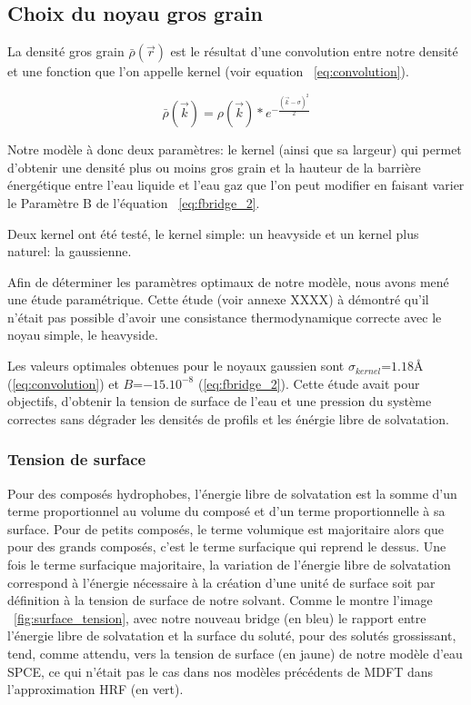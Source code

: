 \subsection{Choix du noyau gros grain}
La densité gros grain $\bar{\rho}(\vec{r})$ est le résultat d'une convolution entre notre densité et une fonction que l'on appelle kernel (voir equation ~\ref{eq:convolution}).

\begin{equation} \label{eq:convolution}
\bar{\rho}(\vec{k})=\rho(\vec{k})*e^{-\frac{(\vec{k}-\sigma)^{2}}{2}}
\end{equation}

Notre modèle à donc deux paramètres: le kernel (ainsi que sa largeur) qui permet d'obtenir une densité plus ou moins gros grain et la hauteur de la barrière énergétique entre l'eau liquide et l'eau gaz que l'on peut modifier en faisant varier le Paramètre B de l'équation ~\ref{eq:fbridge_2}.

Deux kernel ont été testé, le kernel simple: un heavyside et un kernel plus naturel: la gaussienne.

Afin de déterminer les paramètres optimaux de notre modèle, nous avons mené une étude paramétrique. Cette étude (voir annexe XXXX) à démontré qu'il n'était pas possible d'avoir une consistance thermodynamique correcte avec le noyau simple, le heavyside.

Les valeurs optimales obtenues pour le noyaux gaussien sont $\sigma_{kernel}$=$1.18\text{\AA}$ (\ref{eq:convolution}) et $B$=$-15.10^{-8}$ (\ref{eq:fbridge_2}). Cette étude avait pour objectifs, d'obtenir la tension de surface de l'eau et une pression du système correctes sans dégrader les densités de profils et les énérgie libre de solvatation. 



\subsubsection{Tension de surface}
Pour des composés hydrophobes, l'énergie libre de solvatation est la somme d'un terme proportionnel au volume du composé et d'un terme proportionnelle à sa surface. Pour de petits composés, le terme volumique est majoritaire alors que pour des grands composés, c'est le terme surfacique qui reprend le dessus. Une fois le terme surfacique majoritaire, la variation de l'énergie libre de solvatation correspond à l'énergie nécessaire à la création d'une unité de surface soit par définition à la tension de surface de notre solvant. Comme le montre l'image ~\ref{fig:surface_tension}, avec notre nouveau bridge (en bleu) le rapport entre l'énergie libre de solvatation et la surface du soluté, pour des solutés grossissant, tend, comme attendu, vers la tension de surface (en jaune) de notre modèle d'eau SPCE\cite{vega_surface_2007}, ce qui n'était pas le cas dans nos modèles précédents de MDFT dans l'approximation HRF (en vert).

